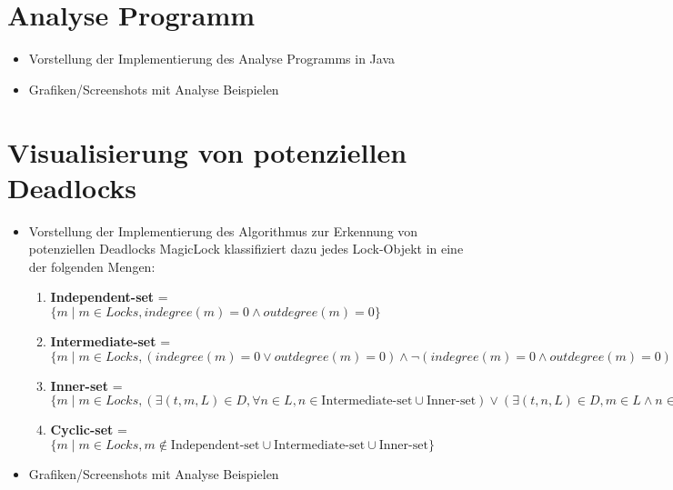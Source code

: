 \section{Analyse Programm}
\label{section:Implementierung:Analyse Programm}
\begin{itemize}
  \item Vorstellung der Implementierung des Analyse Programms in Java
  \item Grafiken/Screenshots mit Analyse Beispielen
\end{itemize}

\section{Visualisierung von potenziellen Deadlocks}
\label{section:Implementierung:Visualisierung von potenziellen Deadlocks}
\begin{itemize}
  \item Vorstellung der Implementierung des Algorithmus zur Erkennung von
  potenziellen Deadlocks MagicLock klassifiziert dazu jedes Lock-Objekt in eine
  der folgenden Mengen:
  \begin{enumerate}
    \item \textbf{Independent-set} = $\{m \mid m \in Locks, indegree(m) = 0
    \land outdegree(m) = 0\}$
    \item \textbf{Intermediate-set} = $\{m \mid m \in Locks, (indegree(m) = 0
    \lor outdegree(m) = 0) \land \lnot (indegree(m) = 0 \land outdegree(m) =
    0)\}$
    \item \textbf{Inner-set} = $\{m \mid m \in Locks, (\exists (t,m,L) \in D,
    \forall n \in L, n \in \text{Intermediate-set} \cup \text{Inner-set}) \lor
    (\exists (t,n,L) \in D, m \in L \land n \in \text{Intermediate-set} \cup
    \text{Inner-set})\}$
    \item \textbf{Cyclic-set} = $\{m \mid m \in Locks, m \notin
    \text{Independent-set} \cup \text{Intermediate-set} \cup \text{Inner-set}\}$
  \end{enumerate}
  \item Grafiken/Screenshots mit Analyse Beispielen
\end{itemize}